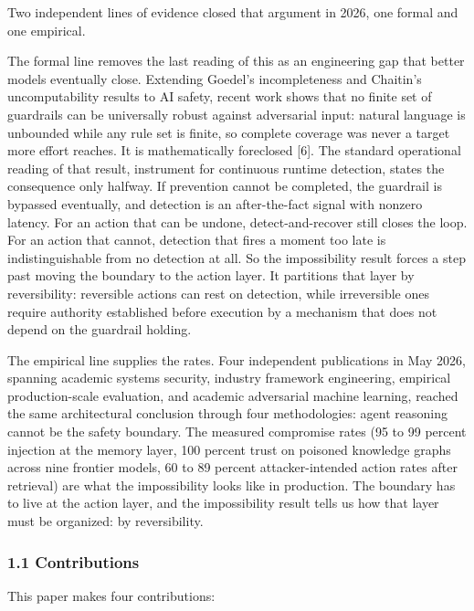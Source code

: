 \documentclass[
  11pt,
]{article}
\begin{document}
Two independent lines of evidence closed that argument in 2026, one
formal and one empirical.

The formal line removes the last reading of this as an engineering gap
that better models eventually close. Extending Goedel's incompleteness
and Chaitin's uncomputability results to AI safety, recent work shows
that no finite set of guardrails can be universally robust against
adversarial input: natural language is unbounded while any rule set is
finite, so complete coverage was never a target more effort reaches. It
is mathematically foreclosed {[}6{]}. The standard operational reading
of that result, instrument for continuous runtime detection, states the
consequence only halfway. If prevention cannot be completed, the
guardrail is bypassed eventually, and detection is an after-the-fact
signal with nonzero latency. For an action that can be undone,
detect-and-recover still closes the loop. For an action that cannot,
detection that fires a moment too late is indistinguishable from no
detection at all. So the impossibility result forces a step past moving
the boundary to the action layer. It partitions that layer by
reversibility: reversible actions can rest on detection, while
irreversible ones require authority established before execution by a
mechanism that does not depend on the guardrail holding.

The empirical line supplies the rates. Four independent publications in
May 2026, spanning academic systems security, industry framework
engineering, empirical production-scale evaluation, and academic
adversarial machine learning, reached the same architectural conclusion
through four methodologies: agent reasoning cannot be the safety
boundary. The measured compromise rates (95 to 99 percent injection at
the memory layer, 100 percent trust on poisoned knowledge graphs across
nine frontier models, 60 to 89 percent attacker-intended action rates
after retrieval) are what the impossibility looks like in production.
The boundary has to live at the action layer, and the impossibility
result tells us how that layer must be organized: by reversibility.

\subsubsection{1.1 Contributions}\label{contributions}

This paper makes four contributions:
\end{document}
